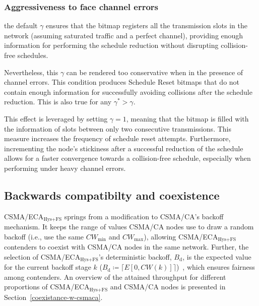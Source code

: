 	
		\subsubsection{Aggressiveness to face channel errors}\label{aggr}
		
		the default $\gamma$ ensures that the bitmap registers all the transmission slots in the network (assuming saturated traffic and a perfect channel), providing enough information for performing the schedule reduction without disrupting collision-free schedules. 
		
		Nevertheless, this $\gamma$ can be rendered too conservative when in the presence of channel errors. This condition produces Schedule Reset bitmaps that do not contain enough information for successfully avoiding collisions after the schedule reduction. This is also true for any $\gamma^{*}>\gamma$.
		
		This effect is leveraged by setting $\gamma=1$, meaning that the bitmap is filled with the information of slots between only two consecutive transmissions. This measure increases the frequency of schedule reset attempts. Furthermore, incrementing the node's stickiness after a successful reduction of the schedule allows for a faster convergence towards a collision-free schedule, especially when performing under heavy channel errors. 
	
	\subsection{Backwards compatibilty and coexistence}
	CSMA/ECA$_{\text{Hys+FS}}$ springs from a modification to CSMA/CA's backoff mechanism. It keeps the range of values CSMA/CA nodes use to draw a random backoff (i.e., use the same $CW_{\min}$ and $CW_{\max}$), allowing CSMA/ECA$_{\text{Hys+FS}}$ contenders to coexist with CSMA/CA nodes in the same network. Further, the selection of CSMA/ECA$_{\text{Hys+FS}}$'s deterministic backoff, $B_{\text{d}}$, is the expected value for the current backoff stage $k$ ($B_{\text{d}}\coloneqq\lceil{E[0,CW(k)]}\rceil$)~\cite{research2standards}, which ensures fairness among contenders. An overview of the attained throughput for different proportions of CSMA/ECA$_{\text{Hys+FS}}$ and CSMA/CA nodes is presented in Section~\ref{coexistance-w-csmaca}.
	
	